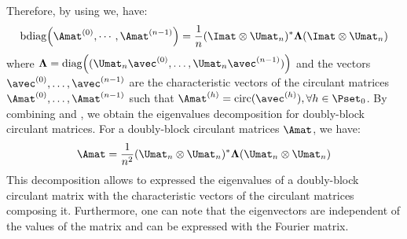 Therefore, by using  we, have:
\begin{equation} \label{equation:ch2-diagonalization_circulant_with_bdiag}
  \bdiag\leftmat \Amat^{(0)}, \cdots, \Amat^{(n-1)} \rightmat = \frac{1}{n} (\Imat \otimes \Umat_n)^* \boldsymbol{\Lambda} (\Imat \otimes \Umat_n)
\end{equation}
where $\boldsymbol{\Lambda} = \diag\left((\Umat_n \avec^{(0)}, \dots, \Umat_n \avec^{(n-1)})\right)$ and the vectors $\avec^{(0)}, \dots, \avec^{(n-1)}$ are the characteristic vectors of the circulant matrices $\Amat^{(0)}, \dots, \Amat^{(n-1)}$ such that $\Amat^{(h)} = \circulant(\avec^{(h)}), \forall h \in \Pset_0$.
By combining  and , we obtain the eigenvalues decomposition for doubly-block circulant matrices. For a doubly-block circulant matrices $\Amat$, we have:
\begin{equation} \label{equation:ch2-diagonalization_doubly_block_circulant_matrix}
  \Amat = \frac{1}{n^2} (\Umat_n \otimes \Umat_n)^* \boldsymbol{\Lambda} (\Umat_n \otimes \Umat_n) 
\end{equation}
This decomposition allows to expressed the eigenvalues of a doubly-block circulant matrix with the characteristic vectors of the circulant matrices composing it.
Furthermore, one can note that the eigenvectors are independent of the values of the matrix and can be expressed with the Fourier matrix.


%




